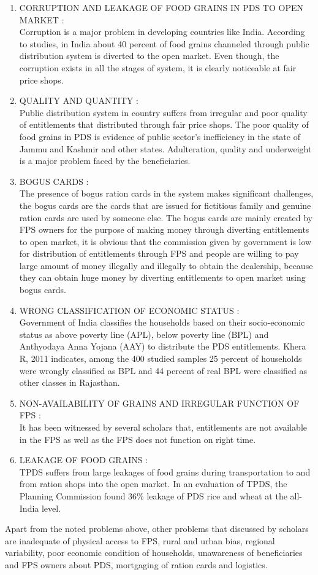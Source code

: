 \documentclass{article}
\begin{document}
\begin{enumerate}
\item CORRUPTION AND LEAKAGE OF FOOD GRAINS IN PDS TO OPEN MARKET : \\
Corruption is a major problem in developing countries like India. According to studies, in India about 40 percent of food grains channeled through public distribution system is diverted to the open market. Even though, the corruption exists in all the stages of system, it is clearly noticeable at fair price shops.
\item QUALITY AND QUANTITY : \\
Public distribution system in country suffers from irregular and poor quality of entitlements that distributed through fair price shops. The poor quality of food grains in PDS is evidence of public sector’s inefficiency in the state of Jammu and Kashmir and other states. Adulteration, quality and underweight is a major problem faced by the beneficiaries.
\item BOGUS CARDS : \\
The presence of bogus ration cards in the system makes significant challenges, the bogus cards are the cards that are issued for fictitious family and genuine ration cards are used by someone else. The bogus cards are mainly created by FPS owners for the purpose of making money through diverting entitlements to open market, it is obvious that the commission given by government is low for distribution of entitlements through FPS and people are willing to pay large amount of money illegally and illegally to obtain the dealership, because they can obtain huge money by diverting entitlements to open market using bogus cards.
\item WRONG CLASSIFICATION OF ECONOMIC STATUS : \\
Government of India classifies the households based on their socio-economic status as above poverty line (APL), below poverty line (BPL) and Anthyodaya Anna Yojana (AAY) to distribute the PDS entitlements. Khera R, 2011 indicates, among the 400 studied samples 25 percent of households were wrongly classified as BPL and 44 percent of real BPL were classified as other classes in Rajasthan.
\item NON-AVAILABILITY OF GRAINS AND IRREGULAR FUNCTION OF FPS : \\
It has been witnessed by several scholars that, entitlements are not available in the FPS as well as the FPS does not function on right time.
\item LEAKAGE OF FOOD GRAINS : \\
TPDS suffers from large leakages of food grains during transportation to and from ration shops into the open market.  In an evaluation of TPDS, the Planning Commission found 36\% leakage of PDS rice and wheat at the all-India level.
\end{enumerate}
Apart from the noted problems above, other problems that discussed by scholars are inadequate of physical access to FPS, rural and urban bias, regional variability, poor economic condition of households, unawareness of beneficiaries and FPS owners about PDS, mortgaging of ration cards and logistics.
\end{document}
